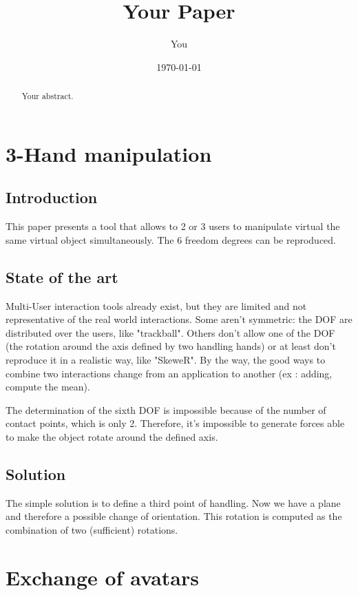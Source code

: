 \documentclass[a4paper]{article}
\title{Your Paper}
\author{You}
\date{\today}
\begin{document}
\maketitle

\begin{abstract}
Your abstract.
\end{abstract}

\section{3-Hand manipulation}

\subsection{Introduction}

This paper presents a tool that allows to 2 or 3 users to manipulate virtual the same virtual object simultaneously. The 6 freedom degrees can be reproduced.

\subsection{State of the art}

Multi-User interaction tools already exist, but they are limited and not representative of the real world interactions. Some aren't symmetric: the DOF are distributed over the users, like "trackball". Others don't allow one of the DOF (the rotation around the axis defined by two handling hands) or at least don't reproduce it in a realistic way, like "SkeweR". By the way, the good ways to combine two interactions change from an application to another (ex : adding, compute the mean).

The determination of the sixth DOF is impossible because of the number of contact points, which is only 2. Therefore, it's impossible to generate forces able to make the object rotate around the defined axis.

\subsection{Solution}

The simple solution is to define a third point of handling. Now we have a plane and therefore a possible change of orientation. This rotation is computed as the combination of two (sufficient) rotations.

\section{Exchange of avatars}
\end{document}
